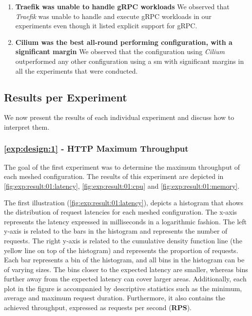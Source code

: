 \begin{enumerate}[label=\textbf{MF\arabic*}, leftmargin=3\parindent]
    \item \textbf{Traefik was unable to handle gRPC workloads}
    \label{exp:mf7}
    We observed that \textit{Traefik} was unable to handle and execute gRPC workloads in our experiments even though it listed explicit support for gRPC.
    
    \item \textbf{Cilium was the best all-round performing configuration, with a significant margin}
    \label{exp:mf8}
    We observed that the configuration using \textit{Cilium} outperformed any other configuration using a \gls{sm} with significant margins in all the experiments that were conducted.
\end{enumerate}



\subsection{Results per Experiment}
\label{sec:experiments:results:per-experiment}

We now present the results of each individual experiment and discuss how to interpret them.

\subsubsection{\ref{exp:design:1} - HTTP Maximum Throughput}
\label{sec:experiments:results:per-experiment:01}

The goal of the first experiment was to determine the maximum throughput of each meshed configuration. The results of this experiment are depicted in \cref{fig:exp:result:01:latency}, \cref{fig:exp:result:01:cpu} and \cref{fig:exp:result:01:memory}. 

The first illustration (\cref{fig:exp:result:01:latency}), depicts a histogram that shows the distribution of request latencies for each meshed configuration. The x-axis represents the latency expressed in milliseconds in a logarithmic fashion. The left y-axis is related to the bars in the histogram and represents the number of requests. The right y-axis is related to the cumulative density function line (the yellow line on top of the histogram) and represents the proportion of requests. Each bar represents a bin of the histogram, and all bins in the histogram can be of varying sizes. The bins closer to the expected latency are smaller, whereas bins further away from the expected latency can cover larger areas. Additionally, each plot in the figure is accompanied by descriptive statistics such as the minimum, average and maximum request duration. Furthermore, it also contains the achieved throughput, expressed as requests per second (\textbf{RPS}).


